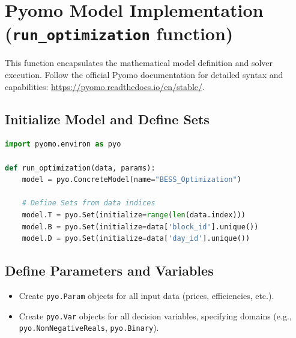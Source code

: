 \documentclass{article}
\begin{document}
\section{Pyomo Model Implementation (\texttt{run\_optimization} function)}
This function encapsulates the mathematical model definition and solver execution. Follow the official Pyomo documentation for detailed syntax and capabilities: \url{https://pyomo.readthedocs.io/en/stable/}.

\subsection{Initialize Model and Define Sets}
\begin{lstlisting}[language=Python]
import pyomo.environ as pyo

def run_optimization(data, params):
    model = pyo.ConcreteModel(name="BESS_Optimization")
    
    # Define Sets from data indices
    model.T = pyo.Set(initialize=range(len(data.index)))
    model.B = pyo.Set(initialize=data['block_id'].unique())
    model.D = pyo.Set(initialize=data['day_id'].unique())
\end{lstlisting}

\subsection{Define Parameters and Variables}
\begin{itemize}
    \item Create \texttt{pyo.Param} objects for all input data (prices, efficiencies, etc.).
    \item Create \texttt{pyo.Var} objects for all decision variables, specifying domains (e.g., \texttt{pyo.NonNegativeReals}, \texttt{pyo.Binary}).
\end{itemize}
\end{document}
